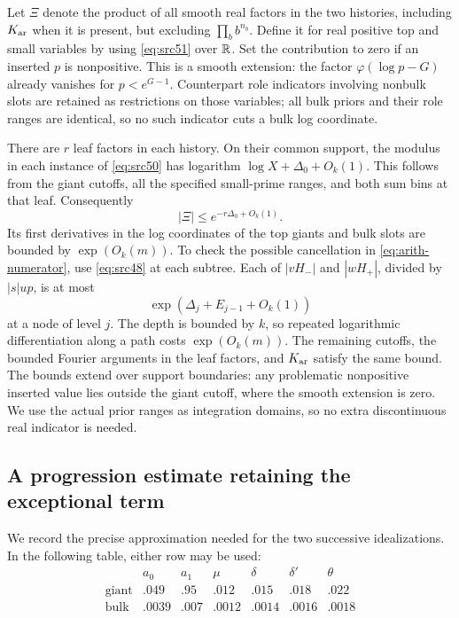 Let $\Xi$ denote the product of all smooth real factors in the two histories,
including $K_{\rm ar}$ when it is present, but excluding
$\prod_b b^{n_b}$. Define it for real positive top and small variables by
using \eqref{eq:src51} over $\mathbb R$. Set the contribution to zero if an inserted
$p$ is nonpositive. This is a smooth extension: the factor
$\varphi(\log p-G)$ already vanishes for $p<e^{G-1}$.
Counterpart role indicators involving nonbulk slots are retained as
restrictions on those variables; all bulk priors and their role ranges are
identical, so no such indicator cuts a bulk log coordinate.

There are $r$ leaf factors in each history. On their common support, the
modulus in each instance of \eqref{eq:src50} has logarithm
$\log X+\Delta_0+O_k(1)$. This follows from the giant cutoffs, all the
specified small-prime ranges, and both sum bins at that leaf. Consequently
\begin{equation}\label{eq:arith-xi-bound}
                         |\Xi|\leq e^{-r\Delta_0+O_k(1)}.
\end{equation}
Its first derivatives in the log coordinates of the top giants and bulk
slots are bounded by $\exp(O_k(m))$. To check the possible cancellation in
\eqref{eq:arith-numerator}, use \eqref{eq:src48} at each subtree. Each of
$|vH_-|$ and $|wH_+|$, divided by $|s|up$, is at most
\[
                         \exp(\Delta_j+E_{j-1}+O_k(1))
\]
at a node of level $j$. The depth is bounded by $k$, so repeated logarithmic
differentiation along a path costs $\exp(O_k(m))$. The remaining cutoffs,
the bounded Fourier arguments in the leaf factors, and $K_{\rm ar}$ satisfy
the same bound. The bounds extend over support boundaries: any problematic
nonpositive inserted value lies outside the giant cutoff, where the smooth
extension is zero. We use the actual prior ranges as integration domains,
so no extra discontinuous real indicator is needed.

\subsection{A progression estimate retaining the exceptional term}

We record the precise approximation needed for the two successive
idealizations. In the following table, either row may be used:
\begin{equation}\label{eq:arith-progression-scales}
\begin{array}{c|rrrrrr}
 &a_0&a_1&\mu&\delta&\delta'&\theta\\ \hline
 \mathrm{giant}&.049&.95&.012&.015&.018&.022\\
 \mathrm{bulk}&.0039&.007&.0012&.0014&.0016&.0018
\end{array}
\end{equation}

